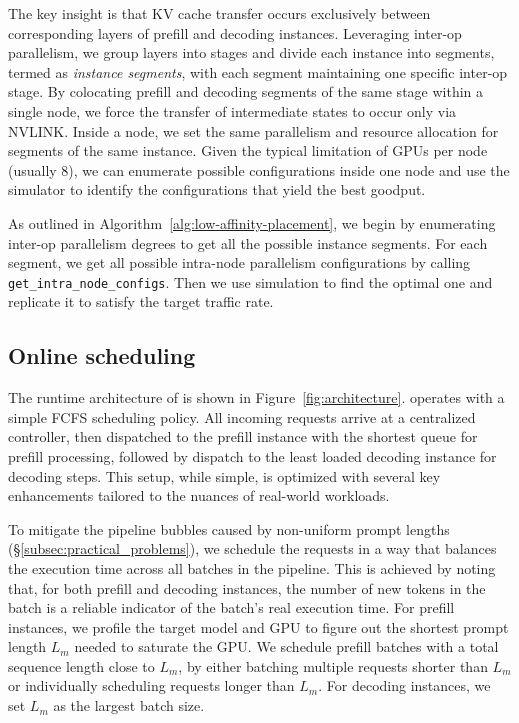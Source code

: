 The key insight is that KV cache transfer occurs exclusively between corresponding layers of prefill and decoding instances.
Leveraging inter-op parallelism, we group layers into stages and divide each instance into segments, termed as \textit{instance segments}, with each segment maintaining one specific inter-op stage. 
By colocating prefill and decoding segments of the same stage within a single node, we force the transfer of intermediate states to occur only via NVLINK. Inside a node, we set the same parallelism and resource allocation for segments of the same instance. Given the typical limitation of GPUs per node (usually 8), we can enumerate possible configurations inside one node and use the simulator to identify the configurations that yield the best goodput.

As outlined in Algorithm~\ref{alg:low-affinity-placement}, we begin by enumerating inter-op parallelism degrees to get all the possible instance segments. For each segment, we get all possible intra-node parallelism configurations by calling \verb|get_intra_node_configs|. Then we use simulation to find the optimal one and replicate it to satisfy the target traffic rate.

\subsection{Online scheduling}
\label{subsec:online_scheduling}


The runtime architecture of \sys is shown in Figure~\ref{fig:architecture}. \sys operates with a simple FCFS scheduling policy. All incoming requests arrive at a centralized controller, then dispatched to the prefill instance with the shortest queue for prefill processing, followed by dispatch to the least loaded decoding instance for decoding steps. This setup, while simple, is optimized with several key enhancements tailored to the nuances of real-world workloads.

To mitigate the pipeline bubbles caused by non-uniform prompt lengths (\S\ref{subsec:practical_problems}), we schedule the requests in a way that balances the execution time across all batches in the pipeline. This is achieved by noting that, for both prefill and decoding instances, the number of new tokens in the batch is a reliable indicator of the batch's real execution time.
For prefill instances, we profile the target model and GPU to figure out the shortest prompt length $L_m$ needed to saturate the GPU. We schedule prefill batches with a total sequence length close to $L_m$, by either batching multiple requests shorter than $L_m$ or individually scheduling requests longer than $L_m$. For decoding instances, we set $L_m$ as the largest batch size.


